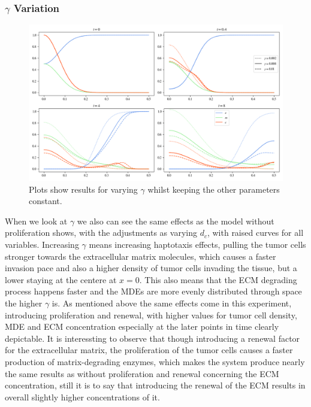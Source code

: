 \subsubsection*{$\gamma$ Variation}

\begin{figure}[h]
    \centering
    \includegraphics[width=\textwidth]{resources/images/prolif_gamma_variation.png}
    \caption{Plots show results for varying $\gamma$ whilst keeping the other parameters constant.}
    \label{fig:prolif_gamma_variation}
\end{figure}

When we look at $\gamma$ we also can see the same effects as the model without proliferation shows, with the adjustments as varying $d_c$, with raised curves for all variables. Increasing $\gamma$ means increasing haptotaxis effects, pulling the tumor cells stronger towards the extracellular matrix molecules, which causes a faster invasion pace and also a higher density of tumor cells invading the tissue, but a lower staying at the centere at $x=0$. This also means that the ECM degrading process happens faster and the MDEs are more evenly distributed through space the higher $\gamma$ is. As mentioned above the same effects come in this experiment, introducing proliferation and renewal, with higher values for tumor cell density, MDE and ECM concentration especially at the later points in time clearly depictable. It is interessting to observe that though introducing a renewal factor for the extracellular matrix, the proliferation of the tumor cells causes a faster production of matrix-degrading enzymes, which makes the system produce nearly the same results as without proliferation and renewal concerning the ECM concentration, still  it is to say that introducing the renewal of the ECM results in overall slightly higher concentrations of it.


